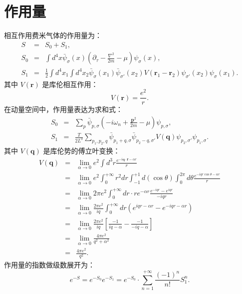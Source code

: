 \documentclass[10pt,UTF8]{ctexart}
\begin{document}
\section*{作用量}
\noindent
相互作用费米气体的作用量为：
\begin{eqnarray}
	S & = & S_{0}+S_{1},\\
	S_{0} & = & \int d^4 x \bar{\psi}_{\sigma}\left(x\right)\left(\partial_{\tau}-\frac{\nabla^{2}}{2m}-\mu\right)\psi_{\sigma}\left(x\right),\\
	S_{1} & = & \frac{1}{2}\int d^{4}x_{1}\int d^{4}x_{2} 
	\bar{\psi}_{\sigma}\left(x_{1}\right)\bar{\psi}_{\sigma'}\left(x_{2}\right)
	V(\bm r_1-\bm r_2)
	\psi_{\sigma'}\left(x_{2}\right)\psi_{\sigma}\left(x_{1}\right).
\end{eqnarray}
其中 $V\left(\bm{r}\right)$ 是库伦相互作用：
\begin{equation}
	V\left(\bm{r}\right)=\frac{e^{2}}{r}.
\end{equation}
在动量空间中，作用量表达为求和式：
\begin{eqnarray}
	S_{0} & = & \sum_{p} \bar{\psi}_{p,\sigma}\left(-i\omega_n+\frac{\bm{p}^{2}}{2m}-\mu\right)\psi_{p,\sigma},\\
	S_{1} & = & \frac{T}{2L^{3}}\sum_{p_{1},p_{2},q} \bar{\psi}_{p_{1}+q,\sigma}\bar{\psi}_{p_{2}-q,\sigma'} V(\bm{q})\psi_{p_2,\sigma'}\psi_{p_1,\sigma}.
\end{eqnarray}
其中 $V(\bm q)$ 是库伦势的傅立叶变换：
\begin{eqnarray}
	V\left(\bm{q}\right) & = & \lim_{\alpha\rightarrow0}e^{2}\int d^{3}r\frac{e^{-i\bm{q}\cdot\bm{r}-\alpha r}}{r}\\
	& = & \lim_{\alpha\rightarrow0}e^{2}\int_{0}^{+\infty}r^{2}dr\int_{-1}^{+1}d\left(\cos\theta\right)\int_{0}^{2\pi}d\theta\frac{e^{-iqr\cos\theta-\alpha r}}{r}\\
	& = & \lim_{\alpha\rightarrow0}2\pi e^{2}\int_{0}^{+\infty}dr\cdot re^{-\alpha r}\frac{e^{-iqr}-e^{iqr}}{-iqr}\\
	& = & \lim_{\alpha\rightarrow0}\frac{2\pi e^{2}}{iq}\int_{0}^{+\infty}dr\left(e^{iqr-\alpha r}-e^{-iqr-\alpha r}\right)\\
	& = & \lim_{\alpha\rightarrow0}\frac{2\pi e^{2}}{iq}\left[\frac{-1}{iq-\alpha}-\frac{-1}{-iq-\alpha}\right]\\
 	& = & \lim_{\alpha\rightarrow0}\frac{4\pi e^{2}}{q^{2}+\alpha^{2}}\\
	& = & \frac{4\pi e^{2}}{q^{2}}.
\end{eqnarray}
作用量的指数做级数展开为：
\begin{equation}
	e^{-S} 
	= e^{-S_{0}}e^{-S_{1}} 
	= e^{-S_{0}}\cdot\sum_{n=1}^{+\infty}\frac{\left(-1\right)^{n}}{n!}S_{1}^{n}.
\end{equation}
\end{document}
